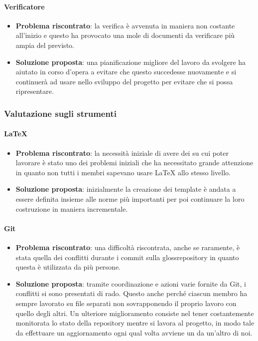 		\paragraph{Verificatore}
			\begin{itemize}
				\item \textbf{Problema riscontrato}: la verifica è avvenuta in maniera non costante all'inizio e questo ha provocato una mole di documenti da verificare più ampia del previsto.
				\item \textbf{Soluzione proposta}: una pianificazione migliore del lavoro da svolgere ha aiutato in corso d'opera a evitare che questo succedesse nuovamente e si continuerà ad usare nello sviluppo del progetto per evitare che si possa ripresentare.
			\end{itemize}

	\subsubsection{Valutazione sugli strumenti}

		\paragraph{\LaTeX}
			\begin{itemize}
				\item \textbf{Problema riscontrato}: la necessità iniziale di avere dei  su cui poter lavorare è stato uno dei problemi iniziali che ha necessitato grande attenzione in quanto non tutti i membri sapevano usare {\LaTeX} allo stesso livello.
				\item \textbf{Soluzione proposta}: inizialmente la creazione dei template è andata a essere definita insieme alle norme più importanti per poi continuare la loro costruzione in maniera incrementale.
			\end{itemize}
		
		\paragraph{Git}
			\begin{itemize}
				\item \textbf{Problema riscontrato}: una difficoltà riscontrata, anche se raramente, è stata quella dei conflitti durante i commit sulla gloss{repository} in quanto questa è utilizzata da più persone.
				\item \textbf{Soluzione proposta}: tramite coordinazione e azioni varie fornite da Git, i conflitti si sono presentati di rado. Questo anche perché ciascun membro ha sempre lavorato su file separati non sovrapponendo il proprio lavoro con quello degli altri. Un ulteriore miglioramento consiste nel tener costantemente monitorata lo stato della repository mentre si lavora al progetto, in modo tale da effettuare un aggiornamento ogni qual volta avviene un  da un'altro di noi. 
			\end{itemize}
		
